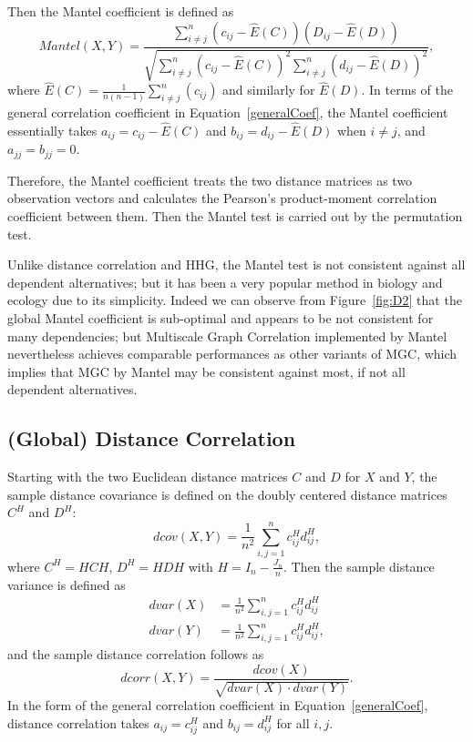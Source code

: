\documentclass[11pt]{article}
\begin{document}
Then the Mantel coefficient \cite{Mantel1967} is defined as 
\begin{equation}
Mantel(X,Y)=\frac{\sum_{i \neq j}^{n}(c_{ij}-\hat{E}(C))(D_{ij}-\hat{E}(D))}{\sqrt{\sum_{i \neq j}^{n}(c_{ij}-\hat{E}(C))^2 \sum_{i \neq j}^{n}(d_{ij}-\hat{E}(D))^2}},
\end{equation}
where $\hat{E}(C)=\frac{1}{n(n-1)}\sum_{i \neq j}^{n}(c_{ij})$ and similarly for $\hat{E}(D)$. In terms of the general correlation coefficient in Equation~\ref{generalCoef}, the Mantel coefficient essentially takes $a_{ij}=c_{ij}-\hat{E}(C)$ and $b_{ij}=d_{ij}-\hat{E}(D)$ when $i \neq j$, and $a_{jj}=b_{jj}=0$.

Therefore, the Mantel coefficient treats the two distance matrices as two observation vectors and calculates the Pearson's product-moment correlation coefficient between them. Then the Mantel test is carried out by the permutation test.

Unlike distance correlation and HHG, the Mantel test is not consistent against all dependent alternatives; but it has been a very popular method in biology and ecology due to its simplicity. Indeed we can observe from Figure~\ref{fig:D2} that the global Mantel coefficient is sub-optimal and appears to be not consistent for many dependencies; but Multiscale Graph Correlation implemented by Mantel nevertheless achieves comparable performances as other variants of MGC, which implies that MGC by Mantel may be consistent against most, if not all dependent alternatives.

\subsection{(Global) Distance Correlation}
\label{main1}
Starting with the two Euclidean distance matrices $C$ and $D$ for $X$ and $Y$, the sample distance covariance is defined on the doubly centered distance matrices $C^{H}$ and $D^{H}$:
\begin{equation}
\label{dcovEqu}
dcov(X,Y)=\frac{1}{n^2}\sum_{i,j=1}^{n}c^{H}_{ij}d^{H}_{ij},
\end{equation}
where $C^{H}=HCH$, $D^{H}=HDH$ with $H=I_{n}-\frac{J_{n}}{n}$. Then the sample distance variance is defined as
\begin{align*}
dvar(X) &=\frac{1}{n^2}\sum_{i,j=1}^{n}c^{H}_{ij}d^{H}_{ij}\\
dvar(Y) &=\frac{1}{n^2}\sum_{i,j=1}^{n}c^{H}_{ij}d^{H}_{ij},
\end{align*}
and the sample distance correlation follows as
\begin{equation}
\label{dcorrEqu}
dcorr(X,Y)=\frac{dcov(X)}{\sqrt{dvar(X) \cdot dvar(Y)}}.
\end{equation}
In the form of the general correlation coefficient in Equation~\ref{generalCoef}, distance correlation takes $a_{ij}=c^{H}_{ij}$ and $b_{ij}=d^{H}_{ij}$ for all $i,j$.
\end{document}
